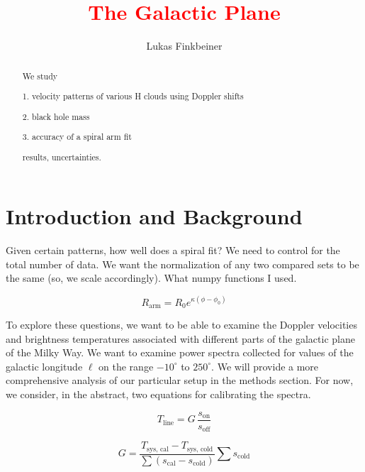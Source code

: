 \documentclass[12pt]{article}
\title{\textcolor{red}{The Galactic Plane}}
\author{Lukas Finkbeiner}
\begin{document}
\maketitle

\begin{abstract}


We study

1. velocity patterns of various H clouds using Doppler shifts

2. black hole mass

3. accuracy of a spiral arm fit

results, uncertainties.

\end{abstract}

\section{Introduction and Background}

Given certain patterns, how well does a spiral fit? We need to control for the total number of data. We want the normalization of any two compared sets to be the same (so, we scale accordingly). What numpy functions I used.

\begin{equation} \label{eq:spiral}
R_\text{arm} = R_0 e^{\kappa(\phi - \phi_0)}
\end{equation}

To explore these questions, we want to be able to examine the Doppler velocities and brightness temperatures associated with different parts of the galactic plane of the Milky Way. We want to examine power spectra collected for values of the galactic longitude $\ell$ on the range $-10^\circ$ to $250^\circ$. We will provide a more comprehensive analysis of our particular setup in the methods section. For now, we consider, in the abstract, two equations for calibrating the spectra. 

\begin{equation} \label{eq:line_shape}
T_\text{line} = G \, \frac{s_\text{on}}{s_\text{off}}
\end{equation}

\begin{equation} \label{eq:line_gain}
G = \frac{T_\text{sys, cal} - T_\text{sys, cold}}{\sum{(s_\text{cal} - s_\text{cold})}} \sum{s_\text{cold}}
\end{equation}
\end{document}
